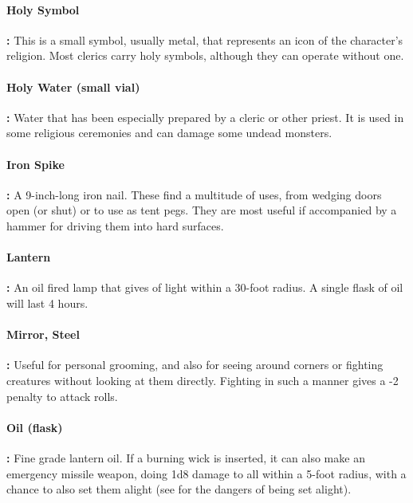 \begin{multicols*}{2}
\paragraph{Holy Symbol}\textbf{:} This is a small symbol, usually metal, that represents an icon of the character’s religion. Most clerics carry holy symbols, although they can operate without one.

\paragraph{Holy Water (small vial)}\textbf{:} Water that has been especially prepared by a cleric or other priest. It is used in some religious ceremonies and can damage some undead monsters.

\paragraph{Iron Spike}\textbf{:} A 9-inch-long iron nail. These find a multitude of uses, from wedging doors open (or shut) or to use as tent pegs. They are most useful if accompanied by a hammer for driving them into hard surfaces.

\paragraph{Lantern}\textbf{:} An oil fired lamp that gives of light within a 30-foot radius. A single flask of oil will last 4 hours.

\paragraph{Mirror, Steel}\textbf{:} Useful for personal grooming, and also for seeing around corners or fighting creatures without looking at them directly. Fighting in such a manner gives a -2 penalty to attack rolls.

\paragraph{Oil (flask)}\textbf{:} Fine grade lantern oil. If a burning wick is inserted, it can also make an emergency missile weapon, doing 1d8 damage to all within a 5-foot radius, with a chance to also set them alight (see  for the dangers of being set alight).


\end{multicols*}
